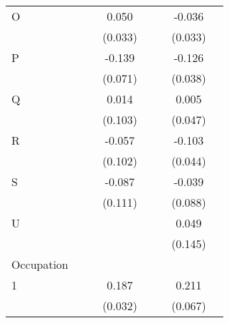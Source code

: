 \begin{longtable}{l*{3}{c}|l*{3}{c}}
		O                   &                     &                     &       0.050         &                     &                     &      -0.036         \\
		&                     &                     &     (0.033)         &                     &                     &     (0.033)         \\
		P                   &                     &                     &      -0.139\sym{*}  &                     &                     &      -0.126\sym{**} \\
		&                     &                     &     (0.071)         &                     &                     &     (0.038)         \\
		Q                   &                     &                     &       0.014         &                     &                     &       0.005         \\
		&                     &                     &     (0.103)         &                     &                     &     (0.047)         \\
		R                   &                     &                     &      -0.057         &                     &                     &      -0.103\sym{*}  \\
		&                     &                     &     (0.102)         &                     &                     &     (0.044)         \\
		S                   &                     &                     &      -0.087         &                     &                     &      -0.039         \\
		&                     &                     &     (0.111)         &                     &                     &     (0.088)         \\
				U                   &                     &                     &                     &                     &                     &       0.049         \\
		&                     &                     &                     &                     &                     &     (0.145)         \\
		Occupation &&&&&\\
		1                   &                     &                     &       0.187\sym{***}&                     &                     &       0.211\sym{**} \\
		&                     &                     &     (0.032)         &                     &                     &     (0.067)         \\

\end{longtable}
